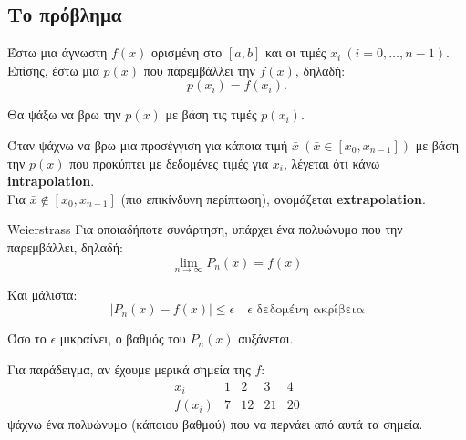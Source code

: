 \documentclass[11pt,a4paper,notitlepage,fleqn,final]{article}
\begin{document}
	\subsection{Το πρόβλημα}

	Έστω μια άγνωστη \( f(x) \) ορισμένη στο \( [a,b] \) και οι τιμές
	\( x_i\ (i=0,\dots,n-1) \). Επίσης, έστω μια \( p(x) \) που
	παρεμβάλλει την \( f(x) \), δηλαδή:
	\[
	p(x_i) = f(x_i).
	\]

	Θα ψάξω να βρω την \( p(x) \) με βάση τις τιμές \( p(x_i) \).

	Όταν ψάχνω να βρω μια προσέγγιση για κάποια τιμή \( \bar x \
	(\bar x \in \left[x_0,x_{n-1}\right]) \) με βάση την \( p(x) \) που
	προκύπτει με δεδομένες τιμές για \( x_i \), λέγεται ότι κάνω
	\textbf{intrapolation}. \\
	Για \( \bar x \notin \left[x_0,x_{n-1}\right] \) (πιο επικίνδυνη
	περίπτωση), ονομάζεται \textbf{extrapolation}.

	\begin{theorem}{}{Weierstrass}
		Για οποιαδήποτε συνάρτηση, υπάρχει ένα πολυώνυμο που την
		παρεμβάλλει, δηλαδή:
		\[
		\lim_{n\to \infty} P_n(x) = f(x)
		\]
	\end{theorem}

	Και μάλιστα:
	\[
	\left|P_n(x)-f(x)\right| \leq \epsilon \quad
	\text{$\epsilon$ δεδομένη ακρίβεια}
	\]

	Όσο το \( \epsilon \) μικραίνει, ο βαθμός του \( P_n(x) \) αυξάνεται.

	Για παράδειγμα, αν έχουμε μερικά σημεία της \( f \):
	\[
	\begin{array}{c|c|c|c|c}
	x_i & 1 & 2 & 3 & 4 \\ \hline
	f(x_i) & 7 & 12 & 21 & 20
	\end{array}
	\]
	ψάχνω ένα πολυώνυμο (κάποιου βαθμού) που να περνάει από αυτά τα
	σημεία.

\end{document}
